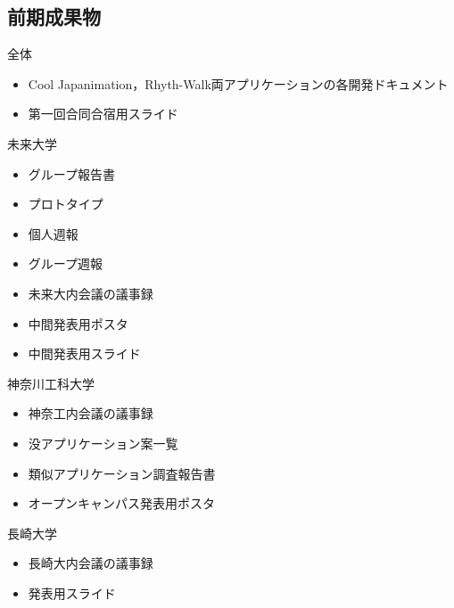 \subsection{前期成果物}

全体
\begin{itemize}
\item Cool Japanimation，Rhyth-Walk両アプリケーションの各開発ドキュメント
\item 第一回合同合宿用スライド　
\end{itemize}

未来大学
\begin{itemize}
\item グループ報告書
\item プロトタイプ
\item 個人週報
\item グループ週報
\item 未来大内会議の議事録
\item 中間発表用ポスタ
\item 中間発表用スライド
\end{itemize}

神奈川工科大学
\begin{itemize}
\item 神奈工内会議の議事録
\item 没アプリケーション案一覧
\item 類似アプリケーション調査報告書
\item オープンキャンパス発表用ポスタ
\end{itemize}

長崎大学
\begin{itemize}
\item 長崎大内会議の議事録
\item 発表用スライド
\end{itemize}
